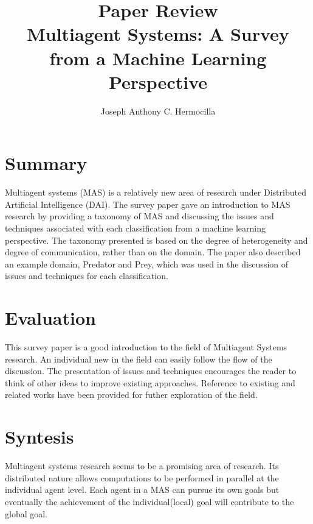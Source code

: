 \documentclass{article}
\title{Paper Review\\
	Multiagent Systems: A Survey from a Machine Learning Perspective\cite{pstone00}}
\author{Joseph Anthony C. Hermocilla}
\begin{document}
\maketitle
\section{Summary}
Multiagent systems (MAS) is a relatively new area of research under Distributed 
Artificial Intelligence (DAI). The survey paper gave an introduction to MAS
research by providing a taxonomy of MAS and discussing the issues and techniques
associated with each classification from a machine learning perspective. 
The taxonomy presented is based on the 
degree of heterogeneity and degree of communication, rather than on the domain. 
The paper also described an example domain, Predator and Prey, which was used in the  
discussion of issues and techniques for each classification. 


\section{Evaluation}
This survey paper is a good introduction to the field of Multiagent Systems research.
An individual new in the field can easily follow the flow of the discussion. The 
presentation of issues and techniques encourages the reader to think of other ideas
to improve existing approaches. Reference to existing and related works have been
provided for futher exploration of the field.

\section{Syntesis}
Multiagent systems research seems to be a promising area of research. Its distributed
nature allows computations to be performed in parallel at the individual agent level.  
Each agent in a MAS can pursue its own goals but eventually the achievement of the
individual(local) goal will contribute to the global goal.



\nocite{pfong04}
\end{document}
